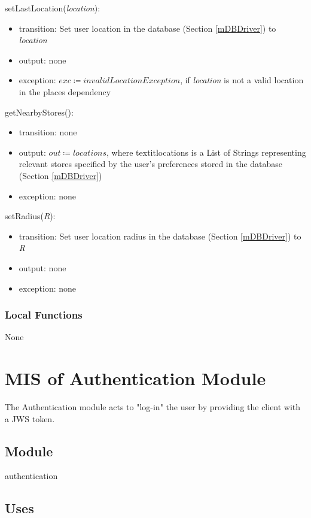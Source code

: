 \documentclass[12pt, titlepage]{article}
\begin{document}
\noindent setLastLocation(\textit{location}):
\begin{itemize}
\item transition: Set user location in the database (Section \ref{mDBDriver}) to \textit{location}
\item output: none
\item exception: \( \textit{exc} \coloneqq invalidLocationException \), if \textit{location} is not a valid location in the places dependency
\end{itemize}

\noindent getNearbyStores():
\begin{itemize}
\item transition: none
\item output: \( \textit{out} \coloneqq locations \), where textit{locations} is a List of Strings representing relevant stores specified by the user's preferences stored in the database (Section \ref{mDBDriver})
\item exception: none
\end{itemize}

\noindent setRadius(\textit{R}):
\begin{itemize}
\item transition: Set user location radius in the database (Section \ref{mDBDriver}) to \textit{R}
\item output: none
\item exception: none
\end{itemize}


\subsubsection{Local Functions}
None

\newpage

\section{MIS of Authentication Module} \label{mAuthentication} 
The Authentication module acts to "log-in" the user by providing the client with a JWS token.

\subsection{Module}

authentication

\subsection{Uses}
\end{document}
